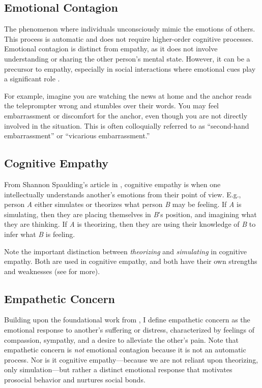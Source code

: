 \documentclass[stu]{apa7}
\begin{document}
\subsection{Emotional Contagion}

The phenomenon where individuals unconsciously mimic the emotions of others. This process is automatic and does not require higher-order cognitive processes. Emotional contagion is distinct from empathy, as it does not involve understanding or sharing the other person's mental state. However, it can be a precursor to empathy, especially in social interactions where emotional cues play a significant role \parencite{maibom_empathy_2020}.

For example, imagine you are watching the news at home and the anchor reads the teleprompter wrong and stumbles over their words. You may feel embarrassment or discomfort for the anchor, even though you are not directly involved in the situation. This is often colloquially referred to as ``second-hand embarrassment'' or ``vicarious embarrassment.''

\subsection{Cognitive Empathy}

From Shannon Spaulding's article in \textcite[p. 13]{maibom_routledge_2017}, cognitive empathy is when one intellectually understands another's emotions from their point of view. E.g., person \textit{A} either simulates or theorizes what person \textit{B} may be feeling. If \textit{A} is simulating, then they are placing themselves in \textit{B}'s position, and imagining what they are thinking. If \textit{A} is theorizing, then they are using their knowledge of \textit{B} to infer what \textit{B} is feeling.

Note the important distinction between \textit{theorizing} and \textit{simulating} in cognitive empathy. Both are used in cognitive empathy, and both have their own strengths and weaknesses (see \cites{barlassina_folk_2017}{hutto_folk_2021} for more). 

\subsection{Empathetic Concern}

Building upon the foundational work from \textcite{batson_empathyaltruism_2015}, I define empathetic concern as the emotional response to another's suffering or distress, characterized by feelings of compassion, sympathy, and a desire to alleviate the other's pain. Note that empathetic concern is \textit{not} emotional contagion because it is not an automatic process. Nor is it cognitive empathy---because we are not reliant upon theorizing, only simulation---but rather a distinct emotional response that motivates prosocial behavior and nurtures social bonds.
\end{document}
